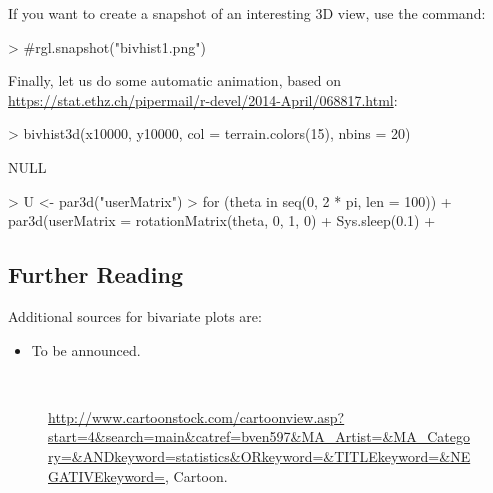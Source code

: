 \documentclass[12pt,letterpaper,final]{article}
\begin{document}
If you want to create a snapshot of an interesting 3D view,
use the command:
%
\begin{Schunk}
\begin{Sinput}
> #rgl.snapshot("bivhist1.png")
\end{Sinput}
\end{Schunk}


Finally, let us do some automatic animation, based on 
\url{https://stat.ethz.ch/pipermail/r-devel/2014-April/068817.html}:


\begin{Schunk}
\begin{Sinput}
> bivhist3d(x10000, y10000, col = terrain.colors(15), nbins = 20)
\end{Sinput}
\begin{Soutput}
NULL
\end{Soutput}
\begin{Sinput}
> U <- par3d("userMatrix")
> for (theta in seq(0, 2 * pi, len = 100)) {
+    par3d(userMatrix = rotationMatrix(theta, 0, 1, 0) %
+    Sys.sleep(0.1)
+ }
\end{Sinput}
\end{Schunk}


\newpage


\subsection{Further Reading}

Additional sources for bivariate plots are:

\begin{itemize}

\item To be announced.

\end{itemize}


~\\[2cm]

\begin{figure}[ht]
\caption{\label{Cartoonstock_RoomBelow}
\url{http://www.cartoonstock.com/cartoonview.asp?start=4&search=main&catref=bven597&MA_Artist=&MA_Category=&ANDkeyword=statistics&ORkeyword=&TITLEkeyword=&NEGATIVEkeyword=},
Cartoon.
}
\end{figure}


\newpage


\end{document}
